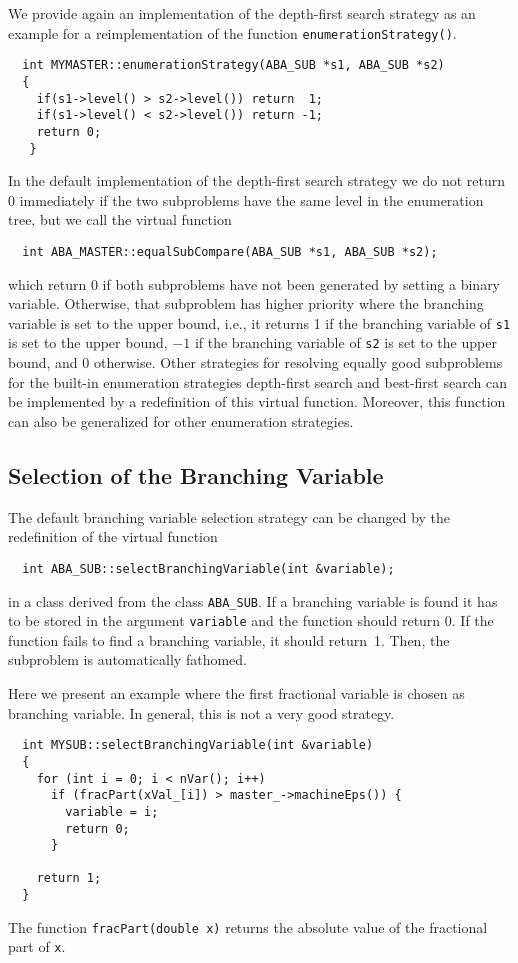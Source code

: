 We provide again an implementation of the depth-first search strategy as
an example for a reimplementation of the function {\tt enumerationStrategy()}.
\begin{verbatim}
  int MYMASTER::enumerationStrategy(ABA_SUB *s1, ABA_SUB *s2)
  {
    if(s1->level() > s2->level()) return  1;
    if(s1->level() < s2->level()) return -1;
    return 0;
   }
\end{verbatim}

In the default implementation of the depth-first search strategy
we do not return 0 immediately if the two subproblems have the same
level in the enumeration tree, but we call the virtual 
function
\begin{verbatim}
  int ABA_MASTER::equalSubCompare(ABA_SUB *s1, ABA_SUB *s2);
\end{verbatim}
\noindent
which return 0 if both subproblems have not been generated by
setting a binary variable. Otherwise, that
subproblem has higher priority where the branching variable is set to the
upper bound, i.e., it returns 1 if the branching variable of {\tt s1} is 
set to the upper bound, $-1$ if the branching variable of {\tt s2} is set to
the upper bound, and 0 otherwise.
Other strategies for resolving equally good subproblems for the built-in 
enumeration strategies depth-first search and best-first search
can be implemented by a redefinition of this virtual function.
Moreover, this function can also be generalized for other enumeration
strategies.

\subsection{Selection of the Branching Variable}
\noindent
The default branching variable selection strategy can be changed
by the redefinition of the virtual 
function
\begin{verbatim}
  int ABA_SUB::selectBranchingVariable(int &variable);
\end{verbatim}
\noindent
in a class derived from the class {\tt ABA\_SUB}. If a branching variable
is found it has to be stored in the argument {\tt variable} and the
function should return 0. If the function fails to find a branching
variable, it should return~1. Then, the subproblem is automatically
fathomed.

Here we present an example where the first fractional variable
is chosen as branching variable. In general, this is not a very
good strategy.
\begin{verbatim}
  int MYSUB::selectBranchingVariable(int &variable)
  {
    for (int i = 0; i < nVar(); i++)
      if (fracPart(xVal_[i]) > master_->machineEps()) {
        variable = i;
        return 0;
      }
  
    return 1;
  }
\end{verbatim}
The function {\tt fracPart(double x)} returns the absolute value
of the fractional part of {\tt x}.

